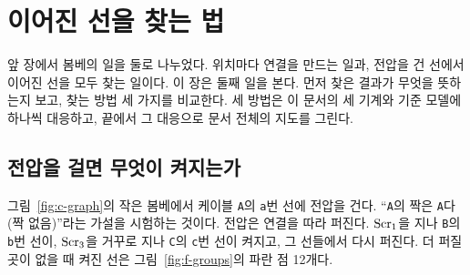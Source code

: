 \chapter{이어진 선을 찾는 법}\label{ch:find}

앞 장에서 봄베의 일을 둘로 나누었다. 위치마다 연결을 만드는 일과, 전압을 건 선에서 이어진 선을 모두 찾는
일이다. 이 장은 둘째 일을 본다. 먼저 찾은 결과가 무엇을 뜻하는지 보고, 찾는 방법 세 가지를 비교한다. 세 방법은
이 문서의 세 기계와 기준 모델에 하나씩 대응하고, 끝에서 그 대응으로 문서 전체의 지도를 그린다.

\section{전압을 걸면 무엇이 켜지는가}\label{sec:f-light}

그림~\ref{fig:c-graph}의 작은 봄베에서 케이블 \texttt{A}의 \texttt{a}번 선에 전압을 건다. ``\texttt{A}의 짝은
\texttt{A}다(짝 없음)''라는 가설을 시험하는 것이다. 전압은 연결을 따라 퍼진다. $\mathrm{Scr}_1$을 지나 \texttt{B}의
\texttt{b}번 선이, $\mathrm{Scr}_3$을 거꾸로 지나 \texttt{C}의 \texttt{c}번 선이 켜지고, 그 선들에서 다시 퍼진다. 더 퍼질
곳이 없을 때 켜진 선은 그림~\ref{fig:f-groups}의 파란 점 12개다.

